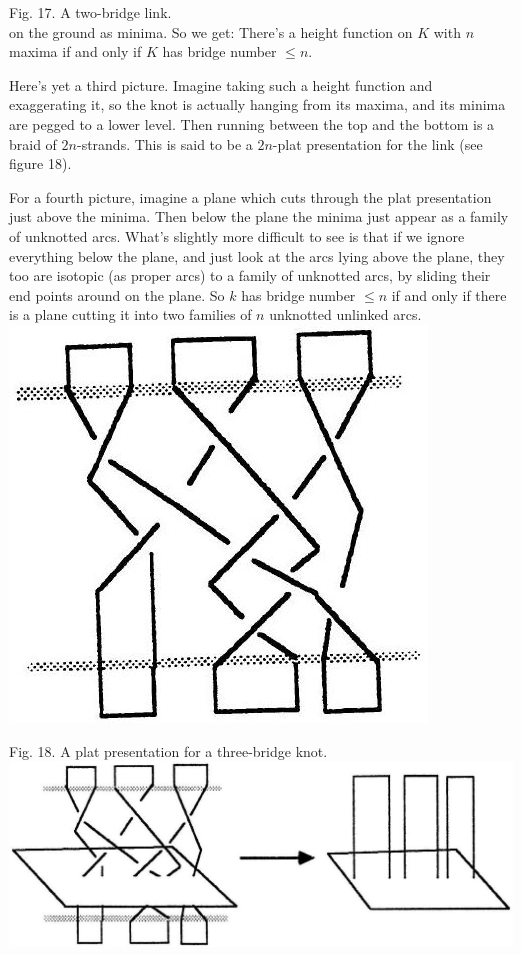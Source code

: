 \documentclass[10pt, letterpaper]{article}
\begin{document}
Fig. 17. A two-bridge link.\\
on the ground as minima. So we get: There's a height function on $K$ with $n$ maxima if and only if $K$ has bridge number $\leq n$.

Here's yet a third picture. Imagine taking such a height function and exaggerating it, so the knot is actually hanging from its maxima, and its minima are pegged to a lower level. Then running between the top and the bottom is a braid of $2 n$-strands. This is said to be a $2 n$-plat presentation for the link (see figure 18).

For a fourth picture, imagine a plane which cuts through the plat presentation just above the minima. Then below the plane the minima just appear as a family of unknotted arcs. What's slightly more difficult to see is that if we ignore everything below the plane, and just look at the arcs lying above the plane, they too are isotopic (as proper arcs) to a family of unknotted arcs, by sliding their end points around on the plane. So $k$ has bridge number $\leq n$ if and only if there is a plane cutting it into two families of $n$ unknotted unlinked arcs.\\
\includegraphics[scale=0.2, center]{2025_05_21_037de704f595ce642d3eg-088}

Fig. 18. A plat presentation for a three-bridge knot.\\
\includegraphics[scale=0.2, center]{2025_05_21_037de704f595ce642d3eg-088(1)}
\end{document}

